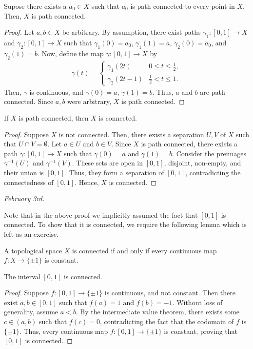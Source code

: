 \begin{lemma}
    Supose there exists a $a_{0} \in X$ such that $a_{0}$ is path connected to every point in $X$. Then, $X$ is path connected.
\end{lemma}
\begin{proof}
    Let $a,b \in X$ be arbitrary. By assumption, there exist paths $\gamma_{1} : [0,1] \to X$ and $\gamma_{2} : [0,1] \to X$ such that $\gamma_{1}(0) = a_{0}$, $\gamma_{1}(1) = a$, $\gamma_{2}(0) = a_{0}$, and $\gamma_{2}(1) = b$. Now, define the map $\gamma : [0,1] \to X$ by
    \begin{align}
        \gamma(t) = \begin{cases}
            \gamma_{1}(2t) & 0 \leq t \leq \frac{1}{2}, \\
            \gamma_{2}(2t-1) & \frac{1}{2} < t \leq 1.
        \end{cases}
    \end{align}
    Then, $\gamma$ is continuous, and $\gamma(0) = a$, $\gamma(1) = b$. Thus, $a$ and $b$ are path connected. Since $a,b$ were arbitrary, $X$ is path connected.
\end{proof}

\begin{theorem}
    If $X$ is path connected, then $X$ is connected.
\end{theorem}
\begin{proof}
    Suppose $X$ is not connected. Then, there exists a separation $U,V$ of $X$ such that $U \cap V = \emptyset$. Let $a \in U$ and $b \in V$. Since $X$ is path connected, there exists a path $\gamma : [0,1] \to X$ such that $\gamma(0) = a$ and $\gamma(1) = b$. Consider the preimages $\gamma^{-1}(U)$ and $\gamma^{-1}(V)$. These sets are open in $[0,1]$, disjoint, non-empty, and their union is $[0,1]$. Thus, they form a separation of $[0,1]$, contradicting the connectedness of $[0,1]$. Hence, $X$ is connected.
\end{proof}

\noindent \textit{February 3rd.}

Note that in the above proof we implicitly assumed the fact that $[0,1]$ is connected. To show that it is connected, we require the following lemma which is left as an exercise.

\begin{lemma}
    A topological space $X$ is connected if and only if every continuous map $f:X \to \{\pm1\}$ is constant.
\end{lemma}

\begin{theorem}
    The interval $[0,1]$ is connected.
\end{theorem}
\begin{proof}
    Suppose $f:[0,1] \to \{\pm1\}$ is continuous, and not constant. Then there exist $a,b \in [0,1]$ such that $f(a) = 1$ and $f(b) = -1$. Without loss of generality, assume $a < b$. By the intermediate value theorem, there exists some $c \in (a,b)$ such that $f(c) = 0$, contradicting the fact that the codomain of $f$ is $\{\pm1\}$. Thus, every continuous map $f:[0,1] \to \{\pm1\}$ is constant, proving that $[0,1]$ is connected.
\end{proof}

